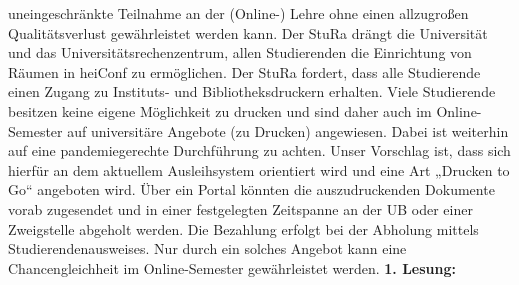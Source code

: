 {        uneingeschränkte
        Teilnahme an der (Online-) Lehre ohne einen allzugroßen Qualitätsverlust
        gewährleistet werden
        kann.
        Der StuRa drängt die Universität und das Universitätsrechenzentrum, allen Studierenden die Einrichtung von Räumen in heiConf zu ermöglichen. 
        Der StuRa fordert, dass alle Studierende einen Zugang zu Instituts- und
        Bibliotheksdruckern
        erhalten. Viele Studierende besitzen keine eigene Möglichkeit zu drucken und sind
        daher auch im
        Online-Semester auf universitäre Angebote (zu Drucken) angewiesen. Dabei ist
        weiterhin auf eine
        pandemiegerechte Durchführung zu achten.
        Unser Vorschlag ist, dass sich hierfür an dem aktuellem Ausleihsystem orientiert wird
        und eine Art
        „Drucken to Go“ angeboten wird. Über ein Portal könnten die auszudruckenden Dokumente
        vorab
        zugesendet und in einer festgelegten Zeitspanne an der UB oder einer Zweigstelle
        abgeholt werden.
        Die Bezahlung erfolgt bei der Abholung mittels Studierendenausweises.
        Nur durch ein solches Angebot kann eine Chancengleichheit im Online-Semester
        gewährleistet
        werden.
    }{
    }{
        \textbf{1. Lesung:}
        \ul{}
    }{
    }
